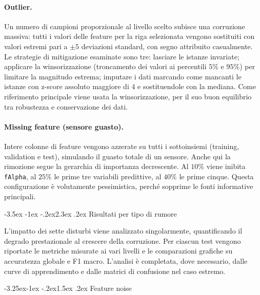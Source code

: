 \documentclass[12pt,a4paper]{article}
\makeatletter
\renewcommand\section{\@startsection{section}{1}{\z@}%
  {-3.5ex \@plus -1ex \@minus -.2ex}{2.3ex \@plus.2ex}%
  {\normalfont\Large\bfseries}}
\renewcommand\subsection{\@startsection{subsection}{2}{\z@}%
  {-3.25ex\@plus -1ex \@minus -.2ex}{1.5ex \@plus .2ex}%
  {\normalfont\large\bfseries}}
\makeatother
\begin{document}
\paragraph{Outlier.} Un numero di campioni proporzionale al livello scelto
subisce una corruzione massiva: tutti i valori delle feature per la riga
selezionata vengono sostituiti con valori estremi pari a $\pm 5$ deviazioni
standard, con segno attribuito casualmente. Le strategie di mitigazione
esaminate sono tre: lasciare le istanze invariate; applicare la winsorizzazione
(troncamento dei valori ai percentili $5\%$ e $95\%$) per limitare la magnitudo
estrema; imputare i dati marcando come mancanti le istanze con z-score assoluto
maggiore di $4$ e sostituendole con la mediana. Come riferimento principale
viene usata la winsorizzazione, per il suo buon equilibrio tra robustezza e
conservazione dei dati.

\paragraph{Missing feature (sensore guasto).} Intere colonne di feature vengono
azzerate su tutti i sottoinsiemi (training, validation e test), simulando il
guasto totale di un sensore. Anche qui la rimozione segue la gerarchia di
importanza decrescente. Al $10\%$ viene inibita \texttt{fAlpha}, al $25\%$ le
prime tre variabili predittive, al $40\%$ le prime cinque. Questa configurazione
è volutamente pessimistica, perché sopprime le fonti informative principali.

\section{Risultati per tipo di rumore}\label{sec:risultati}

L'impatto dei sette disturbi viene analizzato singolarmente, quantificando il
degrado prestazionale al crescere della corruzione. Per ciascun test vengono
riportate le metriche misurate ai vari livelli e le comparazioni grafiche su
accuratezza globale e F1 macro. L'analisi è completata, dove necessario, dalle
curve di apprendimento e dalle matrici di confusione nel caso estremo.

\subsection{Feature noise}
\end{document}
